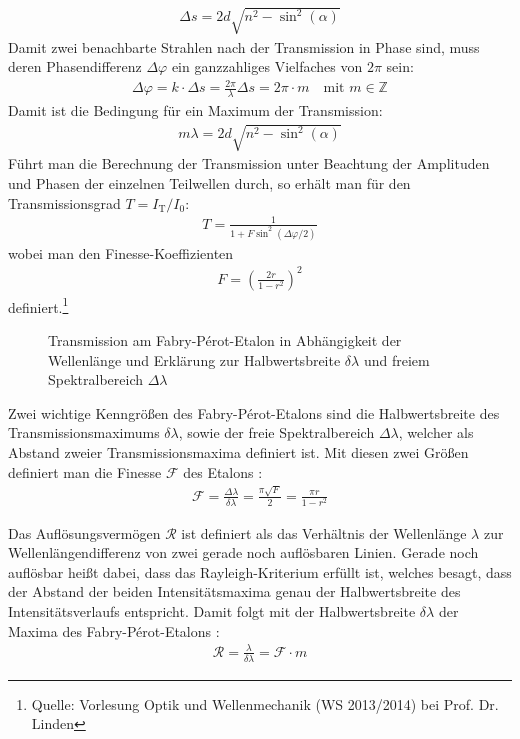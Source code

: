 \documentclass[11pt, a4paper]{article}
\begin{document}
\begin{align*}
	\Delta s = 2 d \sqrt{n^2 - \sin^2(\alpha)}
\end{align*}
Damit zwei benachbarte Strahlen nach der Transmission in Phase sind, muss deren Phasendifferenz $\Delta \varphi$ ein ganzzahliges Vielfaches von $2\pi$ sein:
\begin{align*}
	\Delta \varphi = k \cdot \Delta s = \frac{2\pi}{\lambda} \Delta s = 2 \pi \cdot m \quad \text{mit } m \in \mathbb{Z}
\end{align*}
Damit ist die Bedingung für ein Maximum der Transmission:
\begin{align}
	m \lambda = 2 d \sqrt{n^2 - \sin^2(\alpha)}
	\label{eq:interferenzbedingung}
\end{align}
Führt man die Berechnung der Transmission unter Beachtung der Amplituden und Phasen der einzelnen Teilwellen durch, so erhält man für den Transmissionsgrad $T = I_\mathrm{T} / I_0$:
\begin{align*}
	T = \frac{1}{1 + F \sin^2(\Delta \varphi / 2)}
\end{align*}
wobei man den Finesse-Koeffizienten
\begin{align*}
	F = \left( \frac{2 r}{1 - r^2} \right)^2
\end{align*}
definiert.\footnote{Quelle: Vorlesung Optik und Wellenmechanik (WS 2013/2014) bei Prof. Dr. Linden}
\begin{figure}[h]
	\centering
	\scalebox{0.9}{
	}
	\caption{Transmission am Fabry-Pérot-Etalon in Abhängigkeit der Wellenlänge und Erklärung zur Halbwertsbreite $\delta\lambda$ und freiem Spektralbereich $\Delta\lambda$}
	\label{fig:fabry_transmission}
\end{figure}
Zwei wichtige Kenngrößen des Fabry-Pérot-Etalons sind die Halbwertsbreite des Transmissionsmaximums $\delta \lambda$, sowie der freie Spektralbereich $\Delta \lambda$, welcher als Abstand zweier Transmissionsmaxima definiert ist.
Mit diesen zwei Größen definiert man die Finesse $\mathcal{F}$ des Etalons \cite{hecht}:
\begin{align}
	\mathcal{F} = \frac{\Delta \lambda}{\delta \lambda} = \frac{\pi \sqrt{F}}{2} = \frac{\pi r}{1 - r^2}
	\label{eq:finesse}
\end{align}

Das Auflösungsvermögen $\mathcal{R}$ ist definiert als das Verhältnis der Wellenlänge $\lambda$ zur Wellenlängendifferenz von zwei gerade noch auflösbaren Linien.
Gerade noch auflösbar heißt dabei, dass das Rayleigh-Kriterium erfüllt ist, welches besagt, dass der Abstand der beiden Intensitätsmaxima genau der Halbwertsbreite des Intensitätsverlaufs entspricht.
Damit folgt mit der Halbwertsbreite $\delta \lambda$ der Maxima des Fabry-Pérot-Etalons \cite{hecht}:
\begin{align}
	\mathcal{R} = \frac{\lambda}{\delta \lambda} = \mathcal{F} \cdot m
	\label{eq:aufloesung}
\end{align}
\end{document}
